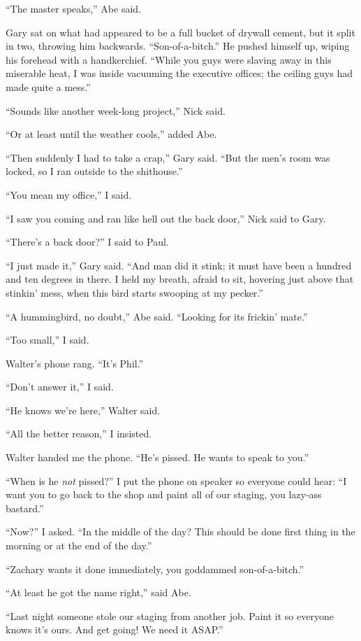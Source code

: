 ``The master speaks,'' Abe said.

Gary sat on what had appeared to be a full bucket of drywall cement, but
it split in two, throwing him backwards. ``Son-of-a-bitch.'' He pushed
himself up, wiping his forehead with a handkerchief. ``While you guys
were slaving away in this miserable heat, I was inside vacuuming the
executive offices; the ceiling guys had made quite a mess.''

``Sounds like another week-long project,'' Nick said.

``Or at least until the weather cools,'' added Abe.

``Then suddenly I had to take a crap,'' Gary said. ``But the men's room
was locked, so I ran outside to the shithouse.''

``You mean my office,'' I said.

``I saw you coming and ran like hell out the back door,'' Nick said to
Gary.

``There's a back door?'' I said to Paul.

``I just made it,'' Gary said. ``And man did it stink; it must have been
a hundred and ten degrees in there. I held my breath, afraid to sit,
hovering just above that stinkin' mess, when this bird starts swooping
at my pecker.''

``A hummingbird, no doubt,'' Abe said. ``Looking for its frickin'
mate.''

``Too small,'' I said.

Walter's phone rang. ``It's Phil.''

``Don't answer it,'' I said.

``He knows we're here,'' Walter said.

``All the better reason,'' I insisted.

Walter handed me the phone. ``He's pissed. He wants to speak to you.''

``When is he \emph{not} pissed?'' I put the phone on speaker so everyone
could hear: ``I want you to go back to the shop and paint all of our
staging, you lazy-ass bastard.''

``Now?'' I asked. ``In the middle of the day? This should be done first
thing in the morning or at the end of the day.''

``Zachary wants it done immediately, you goddammed son-of-a-bitch.''

``At least he got the name right,'' said Abe.

``Last night someone stole our staging from another job. Paint it so
everyone knows it's ours. And get going! We need it ASAP.''

